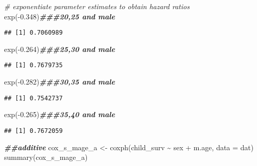 \documentclass[
]{article}
\newenvironment{Shaded}{\begin{snugshade}}{\end{snugshade}}
\newcommand{\AttributeTok}[1]{\textcolor[rgb]{0.77,0.63,0.00}{#1}}
\newcommand{\CommentTok}[1]{\textcolor[rgb]{0.56,0.35,0.01}{\textit{#1}}}
\newcommand{\DocumentationTok}[1]{\textcolor[rgb]{0.56,0.35,0.01}{\textbf{\textit{#1}}}}
\newcommand{\FloatTok}[1]{\textcolor[rgb]{0.00,0.00,0.81}{#1}}
\newcommand{\FunctionTok}[1]{\textcolor[rgb]{0.00,0.00,0.00}{#1}}
\newcommand{\NormalTok}[1]{#1}
\newcommand{\OtherTok}[1]{\textcolor[rgb]{0.56,0.35,0.01}{#1}}
\newcommand{\SpecialCharTok}[1]{\textcolor[rgb]{0.00,0.00,0.00}{#1}}
\begin{document}
\begin{Shaded}
\begin{Highlighting}[]
\CommentTok{\# exponentiate parameter estimates to obtain hazard ratios}
\FunctionTok{exp}\NormalTok{(}\SpecialCharTok{{-}}\FloatTok{0.348}\NormalTok{)}\DocumentationTok{\#\#\#20,25  and male}
\end{Highlighting}
\end{Shaded}

\begin{verbatim}
## [1] 0.7060989
\end{verbatim}

\begin{Shaded}
\begin{Highlighting}[]
\FunctionTok{exp}\NormalTok{(}\SpecialCharTok{{-}}\FloatTok{0.264}\NormalTok{)}\DocumentationTok{\#\#\#25,30 and male}
\end{Highlighting}
\end{Shaded}

\begin{verbatim}
## [1] 0.7679735
\end{verbatim}

\begin{Shaded}
\begin{Highlighting}[]
\FunctionTok{exp}\NormalTok{(}\SpecialCharTok{{-}}\FloatTok{0.282}\NormalTok{)}\DocumentationTok{\#\#\#30,35 and male}
\end{Highlighting}
\end{Shaded}

\begin{verbatim}
## [1] 0.7542737
\end{verbatim}

\begin{Shaded}
\begin{Highlighting}[]
\FunctionTok{exp}\NormalTok{(}\SpecialCharTok{{-}}\FloatTok{0.265}\NormalTok{)}\DocumentationTok{\#\#\#35,40 and male}
\end{Highlighting}
\end{Shaded}

\begin{verbatim}
## [1] 0.7672059
\end{verbatim}

\begin{Shaded}
\begin{Highlighting}[]
\DocumentationTok{\#\#additive}
\NormalTok{cox\_s\_mage\_a }\OtherTok{\textless{}{-}} \FunctionTok{coxph}\NormalTok{(child\_surv }\SpecialCharTok{\textasciitilde{}}\NormalTok{ sex }\SpecialCharTok{+}\NormalTok{ m.age, }\AttributeTok{data =}\NormalTok{ dat)}
\FunctionTok{summary}\NormalTok{(cox\_s\_mage\_a)}
\end{Highlighting}
\end{Shaded}
\end{document}
